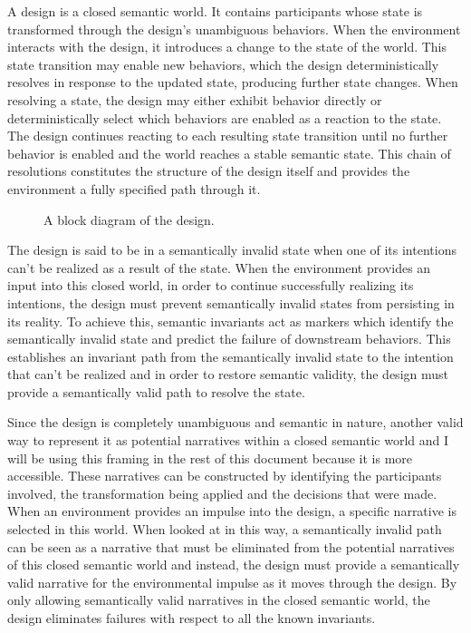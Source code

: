 A design is a closed semantic world. It contains participants whose state is transformed through the design's unambiguous behaviors. When the environment interacts with the design, it introduces a change to the state of the world. This state transition may enable new behaviors, which the design deterministically resolves in response to the updated state, producing further state changes. When resolving a state, the design may either exhibit behavior directly or deterministically select which behaviors are enabled as a reaction to the state. The design continues reacting to each resulting state transition until no further behavior is enabled and the world reaches a stable semantic state. This chain of resolutions constitutes the structure of the design itself and provides the environment a fully specified path through it.

\begin{figure}[htbp]
    
    \caption{A block diagram of the design.}
    \label{fig:the_design}
\end{figure}

The design is said to be in a semantically invalid state when one of its intentions can’t be realized as a result of the state. When the environment provides an input into this closed world, in order to continue successfully realizing its intentions, the design must prevent semantically invalid states from persisting in its reality. To achieve this, semantic invariants act as markers which identify the semantically invalid state and predict the failure of downstream behaviors. This establishes an invariant path from the semantically invalid state to the intention that can’t be realized and in order to restore semantic validity, the design must provide a semantically valid path to resolve the state.

Since the design is completely unambiguous and semantic in nature, another valid way to represent it as potential narratives within a closed semantic world and I will be using this framing in the rest of this document because it is more accessible. These narratives can be constructed by identifying the participants involved, the transformation being applied and the decisions that were made. When an environment provides an impulse into the design, a specific narrative is selected in this world. When looked at in this way, a semantically invalid path can be seen as a narrative that must be eliminated from the potential narratives of this closed semantic world and instead, the design must provide a semantically valid narrative for the environmental impulse as it moves through the design. By only allowing semantically valid narratives in the closed semantic world, the design eliminates failures with respect to all the known invariants.

